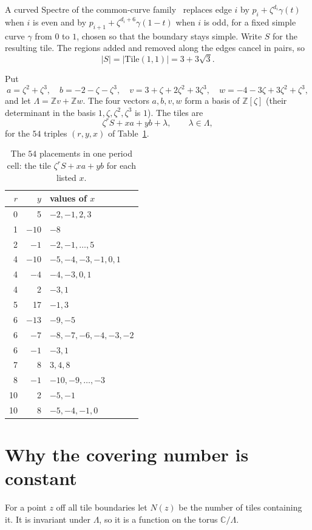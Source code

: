 \documentclass[11pt]{amsart}
\theoremstyle{remark}
\newcommand{\Z}{\mathbb Z}
\newcommand{\C}{\mathbb C}
\begin{document}
A curved Spectre of the common-curve family~\cite[Lemma~2.1]{SMKG} replaces edge $i$ by
$p_i+\zeta^{d_i}\gamma(t)$ when $i$ is even and by $p_{i+1}+\zeta^{d_i+6}\gamma(1-t)$ when $i$ is odd, for a
fixed simple curve $\gamma$ from $0$ to $1$, chosen so that the boundary stays simple. Write $S$ for the
resulting tile. The regions added and removed along the edges cancel in pairs, so
\[
|S|=|\mathrm{Tile}(1,1)|=3+3\sqrt3 .
\]

Put
\[
a=\zeta^2+\zeta^3,\quad b=-2-\zeta-\zeta^3,\quad v=3+\zeta+2\zeta^2+3\zeta^3,\quad
w=-4-3\zeta+3\zeta^2+\zeta^3,
\]
and let $\Lambda=\Z v+\Z w$. The four vectors $a,b,v,w$ form a basis of $\Z[\zeta]$ (their determinant in
the basis $1,\zeta,\zeta^2,\zeta^3$ is $1$). The tiles are
\[
\zeta^rS+xa+yb+\lambda,\qquad \lambda\in\Lambda,
\]
for the $54$ triples $(r,y,x)$ of Table~\ref{tab:placements}.

\begin{table}[ht]
\centering
\begin{tabular}{rrl}
\toprule
$r$ & $y$ & values of $x$\\
\midrule
0 & 5 & $-2,-1,2,3$\\
1 & $-10$ & $-8$\\
2 & $-1$ & $-2,-1,\dots,5$\\
4 & $-10$ & $-5,-4,-3,-1,0,1$\\
4 & $-4$ & $-4,-3,0,1$\\
4 & 2 & $-3,1$\\
5 & 17 & $-1,3$\\
6 & $-13$ & $-9,-5$\\
6 & $-7$ & $-8,-7,-6,-4,-3,-2$\\
6 & $-1$ & $-3,1$\\
7 & 8 & $3,4,8$\\
8 & $-1$ & $-10,-9,\dots,-3$\\
10 & 2 & $-5,-1$\\
10 & 8 & $-5,-4,-1,0$\\
\bottomrule
\end{tabular}
\caption{The $54$ placements in one period cell: the tile $\zeta^rS+xa+yb$ for each listed $x$.}
\label{tab:placements}
\end{table}

\section{Why the covering number is constant}

For a point $z$ off all tile boundaries let $N(z)$ be the number of tiles containing it. It is invariant
under $\Lambda$, so it is a function on the torus $\C/\Lambda$.
\end{document}
